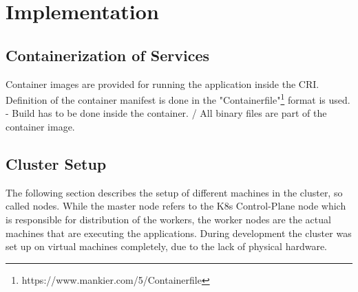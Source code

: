 \chapter{Implementation} %

\label{chap:implementation} %



\section{Containerization of Services}
Container images are provided for running the application inside the \ac{CRI}. Definition of the container manifest is done in the "Containerfile"\footnote{https://www.mankier.com/5/Containerfile} format is used.
- Build has to be done inside the container. / All binary files are part of the container image.









\section{Cluster Setup}
The following section describes the setup of different machines in the cluster, so called nodes. While the master node refers to the \ac{K8s} Control-Plane node which is responsible for distribution of the workers, the worker nodes are the actual machines that are executing the applications. During development the cluster was set up on virtual machines completely, due to the lack of physical hardware.



